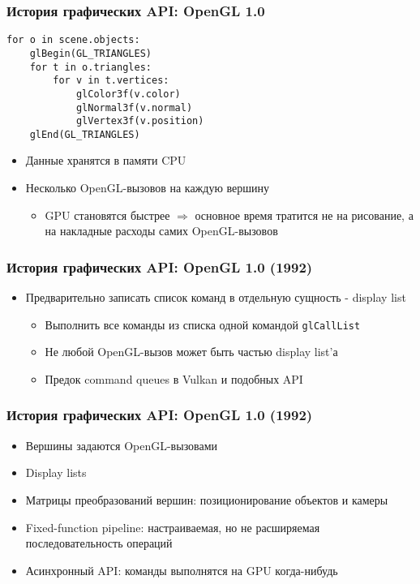 \documentclass{beamer}
\begin{document}
\begin{frame}[fragile]
\frametitle{История графических API: OpenGL 1.0}
\begin{verbatim}
for o in scene.objects:
    glBegin(GL_TRIANGLES)
    for t in o.triangles:
        for v in t.vertices:
            glColor3f(v.color)
            glNormal3f(v.normal)
            glVertex3f(v.position)
    glEnd(GL_TRIANGLES)
\end{verbatim}
\pause
\begin{itemize}
\item Данные хранятся в памяти CPU
\pause
\item Несколько OpenGL-вызовов на каждую вершину
\pause
\begin{itemize}
\item GPU становятся быстрее $\Longrightarrow$ основное время тратится не на рисование, а на накладные расходы самих OpenGL-вызовов
\end{itemize}
\end{itemize}
\end{frame}

\begin{frame}[fragile]
\frametitle{История графических API: OpenGL 1.0 (1992)}
\begin{itemize}
\item Предварительно записать список команд в отдельную сущность - display list
\begin{itemize}
\item Выполнить все команды из списка одной командой \verb|glCallList|
\item Не любой OpenGL-вызов может быть частью display list'а
\item Предок command queues в Vulkan и подобных API
\end{itemize}
\end{itemize}
\end{frame}

\begin{frame}
\frametitle{История графических API: OpenGL 1.0 (1992)}
\begin{itemize}
\item Вершины задаются OpenGL-вызовами
\item Display lists
\item Матрицы преобразований вершин: позиционирование объектов и камеры
\item Fixed-function pipeline: настраиваемая, но не расширяемая последовательность операций
\item Асинхронный API: команды выполнятся на GPU когда-нибудь
\end{itemize}
\end{frame}
\end{document}
